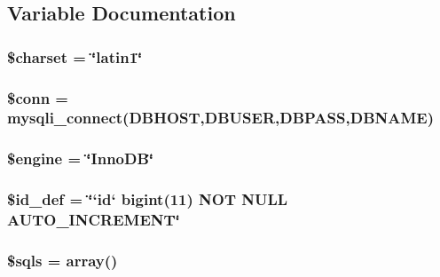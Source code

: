 \subsection{Variable Documentation}
\hypertarget{schema-db_8php_af10158dd74b75f1d337e83102d6b82ce}{
\subsubsection[{\$charset}]{\setlength{\rightskip}{0pt plus 5cm}\$charset = \char`\"{}latin1\char`\"{}}}\label{schema-db_8php_af10158dd74b75f1d337e83102d6b82ce}
\hypertarget{schema-db_8php_aa8a5a87b9c1a6a0819b88447cbe41877}{
\subsubsection[{\$conn}]{\setlength{\rightskip}{0pt plus 5cm}\$conn = mysqli\-\_\-connect({\bf D\-B\-H\-O\-S\-T},{\bf D\-B\-U\-S\-E\-R},{\bf D\-B\-P\-A\-S\-S},{\bf D\-B\-N\-A\-M\-E})}}\label{schema-db_8php_aa8a5a87b9c1a6a0819b88447cbe41877}
\hypertarget{schema-db_8php_a8a3b012ad4844366d9207d8f0e174a00}{
\subsubsection[{\$engine}]{\setlength{\rightskip}{0pt plus 5cm}\$engine = \char`\"{}Inno\-D\-B\char`\"{}}}\label{schema-db_8php_a8a3b012ad4844366d9207d8f0e174a00}
\hypertarget{schema-db_8php_acafba87ce83b03b84b50986f6b889af9}{
\subsubsection[{\$id\-\_\-def}]{\setlength{\rightskip}{0pt plus 5cm}\$id\-\_\-def = \char`\"{}`id` bigint(11) N\-O\-T N\-U\-L\-L A\-U\-T\-O\-\_\-\-I\-N\-C\-R\-E\-M\-E\-N\-T\char`\"{}}}\label{schema-db_8php_acafba87ce83b03b84b50986f6b889af9}
\hypertarget{schema-db_8php_a4df5cfe5ef69919928b0b8eefb5b37bb}{
\subsubsection[{\$sqls}]{\setlength{\rightskip}{0pt plus 5cm}\$sqls = array()}}\label{schema-db_8php_a4df5cfe5ef69919928b0b8eefb5b37bb}
